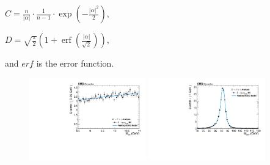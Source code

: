 $C = \frac{n}{\left| \alpha \right|} \cdot \frac{1}{n-1} \cdot \exp\left(- \frac {\left| \alpha \right|^2}{2}\right),$

$D = \sqrt{\frac{\pi}{2}} \left(1 + \operatorname{erf}\left(\frac{\left| \alpha \right|}{\sqrt 2}\right)\right),$

and $erf$ is the error function.



\begin{figure}[!htbp]
\begin{center}


\includegraphics[width=0.45\textwidth]{figures_and_tables/fitPlotFiles2D/ZToUpsilonPhotonSignalAndBackgroundFit/mMuMNU_ZToUpsilon1SPhotonSignalAndBackgroundFit_PeakingBackground_Cat0}\hspace*{1.cm}
\includegraphics[width=0.45\textwidth]{figures_and_tables/fitPlotFiles2D/ZToUpsilonPhotonSignalAndBackgroundFit/mHZ_ZToUpsilon1SPhotonSignalAndBackgroundFit_PeakingBackground_Cat0}\hspace*{1.cm}


\end{center}
\end{figure}
